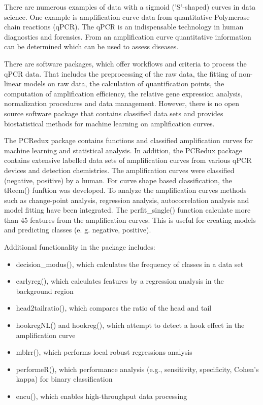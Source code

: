 \documentclass [12pt]{article}
\begin{document}
There are numerous examples of data with a sigmoid ('S'-shaped) curves in data science. One example is amplification curve data from quantitative Polymerase chain reactions (qPCR). The qPCR is an indispensable technology in human diagnostics and forensics. From an amplification curve quantitative information can be determined which can be used to assess diseases.

There are software packages, which offer workflows and criteria to process the qPCR data. That includes the preprocessing of the raw data, the fitting of non-linear models on raw data, the calculation of quantification points, the computation of amplification efficiency, the relative gene expression analysis, normalization procedures and data management. However, there is no open source software package that contains classified data sets and provides biostatistical methods for machine learning on amplification curves.

The PCRedux package contains functions and classified amplification curves for machine learning and statistical analysis. In addition, the PCRedux package contains extensive labelled data sets of amplification curves from various qPCR devices and detection chemistries. The amplification curves were classified (negative, positive) by a human. For curve shape based classification, the tReem() funftion was developed. To analyze the amplification curves methods such as change-point analysis, regression analysis, autocorrelation analysis and model fitting have been integrated. The pcrfit\_single() function calculate more than 45 features from the amplification curves. This is useful for creating models and predicting classes (e. g. negative, positive).

Additional functionality in the package includes:
\begin{itemize}
\setlength\itemsep{.1em}
\item decision\_modus(), which calculates the frequency of classes in a data set
\item earlyreg(), which calculates features by a regression analysis in the background region
\item head2tailratio(), which compares the ratio of the head and tail
\item hookregNL() and hookreg(), which attempt to detect a hook effect in the amplification curve
\item mblrr(), which performs local robust regressions analysis
\item performeR(), which performance analysis (e.g., sensitivity, specificity, Cohen's kappa) for binary classification
\item encu(), which enables high-throughput data processing
\end{itemize}
\end{document}
